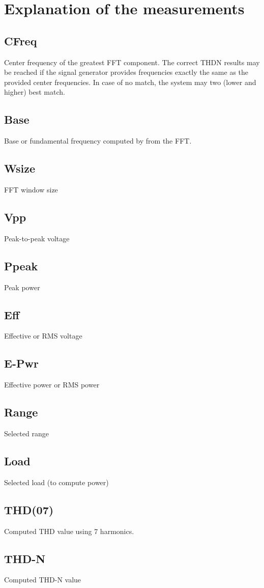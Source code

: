 \documentclass[10pt,a4paper]{article}
\begin{document}
\section{Explanation of the measurements}
\subsection{CFreq}
Center frequency of the greatest FFT component. The correct THDN results may be reached if the signal generator provides frequencies exactly the same as the provided center frequencies. In case of no match, the system may two (lower and higher) best match.
\subsection{Base}
Base or fundamental frequency computed by from the FFT.
\subsection{Wsize}
FFT window size
\subsection{Vpp}
Peak-to-peak voltage
\subsection{Ppeak}
Peak power
\subsection{Eff}
Effective or RMS voltage
\subsection{E-Pwr}
Effective power or RMS power
\subsection{Range}
Selected range
\subsection{Load}
Selected load (to compute power)
\subsection{THD(07)}
Computed THD value using 7 harmonics.
\subsection{THD-N}
Computed THD-N value
\end{document}
